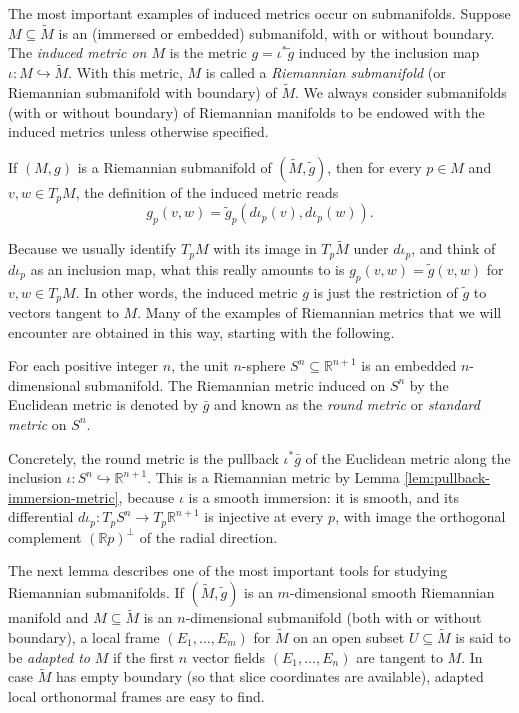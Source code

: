 The most important examples of induced metrics occur on submanifolds. Suppose $M \subseteq \tilde{M}$ is an (immersed or embedded) submanifold, with or without boundary. The \emph{induced metric on $M$} is the metric $g = \iota^*\tilde{g}$ induced by the inclusion map $\iota : M \hookrightarrow \tilde{M}$. With this metric, $M$ is called a \emph{Riemannian submanifold} (or Riemannian submanifold with boundary) of $\tilde{M}$. We always consider submanifolds (with or without boundary) of Riemannian manifolds to be endowed with the induced metrics unless otherwise specified.

If $(M, g)$ is a Riemannian submanifold of $(\tilde{M}, \tilde{g})$, then for every $p \in M$ and $v, w \in T_p M$, the definition of the induced metric reads
\[
g_p(v,w) = \tilde{g}_p(d\iota_p(v), d\iota_p(w)).
\]

Because we usually identify $T_p M$ with its image in $T_p \tilde{M}$ under $d\iota_p$, and think of $d\iota_p$ as an inclusion map, what this really amounts to is $g_p(v,w) = \tilde{g}(v,w)$ for $v,w \in T_p M$. In other words, the induced metric $g$ is just the restriction of $\tilde{g}$ to vectors tangent to $M$. Many of the examples of Riemannian metrics that we will encounter are obtained in this way, starting with the following.

\begin{definition}[Spheres]
\label{ex:spheres}
\leanok
{}
For each positive integer $n$, the unit $n$-sphere $S^n \subseteq \mathbb{R}^{n+1}$ is an embedded $n$-dimensional submanifold. The Riemannian metric induced on $S^n$ by the Euclidean metric is denoted by $\bar{g}$ and known as the \textit{round metric} or \textit{standard metric} on $S^n$.

Concretely, the round metric is the pullback $\iota^* \bar{g}$ of the Euclidean metric along the inclusion $\iota : S^n \hookrightarrow \mathbb{R}^{n+1}$. This is a Riemannian metric by Lemma \ref{lem:pullback-immersion-metric}, because $\iota$ is a smooth immersion: it is smooth, and its differential $d\iota_p : T_p S^n \to T_p\mathbb{R}^{n+1}$ is injective at every $p$, with image the orthogonal complement $(\mathbb{R}p)^\perp$ of the radial direction.
\end{definition}

The next lemma describes one of the most important tools for studying Riemannian submanifolds. If $(\tilde{M}, \tilde{g})$ is an $m$-dimensional smooth Riemannian manifold and $M \subseteq \tilde{M}$ is an $n$-dimensional submanifold (both with or without boundary), a local frame $(E_1, \ldots, E_m)$ for $\tilde{M}$ on an open subset $U \subseteq \tilde{M}$ is said to be \textit{adapted to} $M$ if the first $n$ vector fields $(E_1, \ldots, E_n)$ are tangent to $M$. In case $\tilde{M}$ has empty boundary (so that slice coordinates are available), adapted local orthonormal frames are easy to find.

